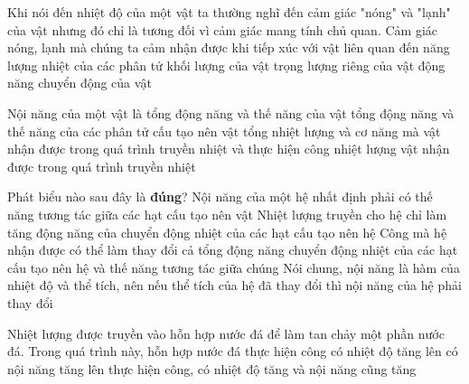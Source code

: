 \begin{ex}
	Khi nói đến nhiệt độ của một vật ta thường nghĩ đến cảm giác "nóng" và "lạnh" của vật nhưng đó chỉ là tương đối vì cảm giác mang tính chủ quan. Cảm giác nóng, lạnh mà chúng ta cảm nhận được khi tiếp xúc với vật liên quan đến
	\choice
	{\True năng lượng nhiệt của các phân tử}
	{khối lượng của vật}
	{trọng lượng riêng của vật}
	{động năng chuyển động của vật}
	\loigiai{}
\end{ex}
\begin{ex}
	Nội năng của một vật là
	\choice
	{tổng động năng và thế năng của vật}
	{\True tổng động năng và thế năng của các phân tử cấu tạo nên vật}
	{tổng nhiệt lượng và cơ năng mà vật nhận được trong quá trình truyền nhiệt và thực hiện công}
	{nhiệt lượng vật nhận được trong quá trình truyền nhiệt}
	\loigiai{}
\end{ex}
\begin{ex}
	Phát biểu nào sau đây là \textbf{đúng}?
	\choice
	{Nội năng của một hệ nhất định phải có thế năng tương tác giữa các hạt cấu tạo nên vật}
	{Nhiệt lượng truyền cho hệ chỉ làm tăng động năng của chuyển động nhiệt của các hạt cấu tạo nên hệ}
	{\True Công mà hệ nhận được có thể làm thay đổi cả tổng động năng chuyển động nhiệt của các hạt cấu tạo nên hệ và thế năng tương tác giữa chúng}
	{Nói chung, nội năng là hàm của nhiệt độ và thể tích, nên nếu thể tích của hệ đã thay đổi thì nội năng của hệ phải thay đổi}
	\loigiai{}
\end{ex}

\begin{ex}
	Nhiệt lượng được truyền vào hỗn hợp nước đá để làm tan chảy một phần nước đá. Trong quá trình này, hỗn hợp nước đá
	\choice
	{thực hiện công}
	{có nhiệt độ tăng lên}
	{\True có nội năng tăng lên}
	{thực hiện công, có nhiệt độ tăng và nội năng cũng tăng}
	\loigiai{}
\end{ex}

